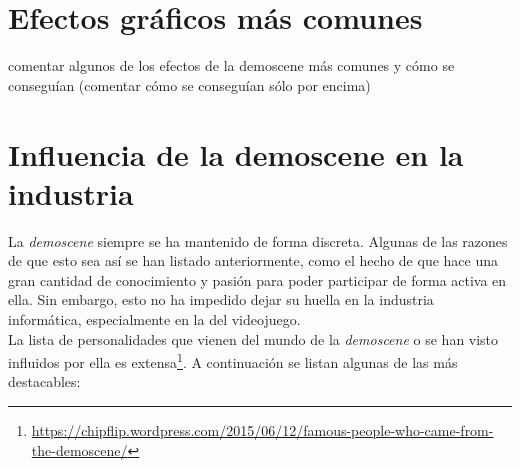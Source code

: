 \section{Efectos gráficos más comunes}
comentar algunos de los efectos de la demoscene más comunes y cómo se conseguían (comentar cómo se conseguían sólo por encima)


\section{Influencia de la demoscene en la industria}

La \emph{demoscene} siempre se ha mantenido de forma discreta. Algunas de las razones de que esto sea así se han listado anteriormente, como el hecho de que hace una gran cantidad de conocimiento y pasión para poder participar de forma activa en ella. Sin embargo, esto no ha impedido dejar su huella en la industria informática, especialmente en la del videojuego.\\

La lista de personalidades que vienen del mundo de la \emph{demoscene} o se han visto influidos por ella es extensa\footnote{\url{https://chipflip.wordpress.com/2015/06/12/famous-people-who-came-from-the-demoscene/}}. A continuación se listan algunas de las más destacables:

